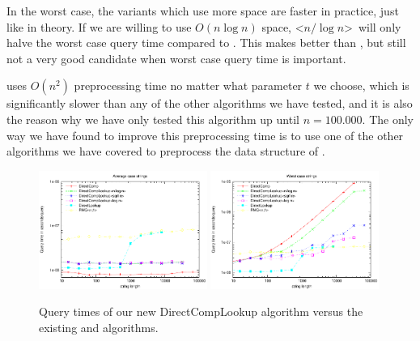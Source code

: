 \documentclass[a4]{article}
\begin{document}
In the worst case, the  variants which use more space are faster in practice, just like in theory. If we are willing to use $O(n\log n)$ space, \textless$n/\log n$\textgreater\ will only halve the worst case query time compared to . This makes  better than , but still not a very good candidate when worst case query time is important.

 uses $O(n^2)$ preprocessing time no matter what parameter $t$ we choose, which is significantly slower than any of the other algorithms we have tested, and it is also the reason why we have only tested this algorithm up until $n=100.000$. The only way we have found to improve this preprocessing time is to use one of the other algorithms we have covered to preprocess the data structure of .

\begin{figure}[tp]
    \begin{center}
        \includegraphics[width=0.49\textwidth,type=pdf,ext=.pdf,read=.pdf]{../src/results/length-complookup-rand10.plt}
        \includegraphics[width=0.49\textwidth,type=pdf,ext=.pdf,read=.pdf]{../src/results/length-complookup-alla.plt}
    \end{center}
    \caption{\label{fig:plot-complookup}Query times of our new DirectCompLookup algorithm versus the existing  and  algorithms.}
\end{figure}

\end{document}
